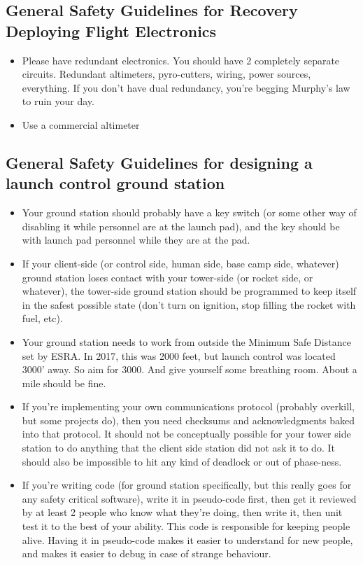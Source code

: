 \subsection{General Safety Guidelines for Recovery Deploying Flight Electronics}
\begin{itemize}
\item Please have redundant electronics. You should have 2 completely separate circuits. Redundant altimeters, pyro-cutters, wiring, power sources, everything. If you don't have dual redundancy, you're begging Murphy’s law to ruin your day.
\item Use a commercial altimeter
\end{itemize}

\subsection{General Safety Guidelines for designing a launch control ground station}
\begin{itemize}
\item Your ground station should probably have a key switch (or some other way of disabling it while personnel are at the launch pad), and the key should be with launch pad personnel while they are at the pad.
\item If your client-side (or control side, human side, base camp side, whatever) ground station loses contact with your tower-side (or rocket side, or whatever), the tower-side ground station should be programmed to keep itself in the safest possible state (don't turn on ignition, stop filling the rocket with fuel, etc).
\item Your ground station needs to work from outside the Minimum Safe Distance set by ESRA. In 2017, this was 2000 feet, but launch control was located 3000' away. So aim for 3000. And give yourself some breathing room. About a mile should be fine.
\item If you're implementing your own communications protocol (probably overkill, but some projects do), then you need checksums and acknowledgments baked into that protocol. It should not be conceptually possible for your tower side station to do anything that the client side station did not ask it to do. It should also be impossible to hit any kind of deadlock or out of phase-ness.
\item If you're writing code (for ground station specifically, but this really goes for any safety critical software), write it in pseudo-code first, then get it reviewed by at least 2 people who know what they're doing, then write it, then unit test it to the best of your ability. This code is responsible for keeping people alive. Having it in pseudo-code makes it easier to understand for new people, and makes it easier to debug in case of strange behaviour.
\end{itemize}
